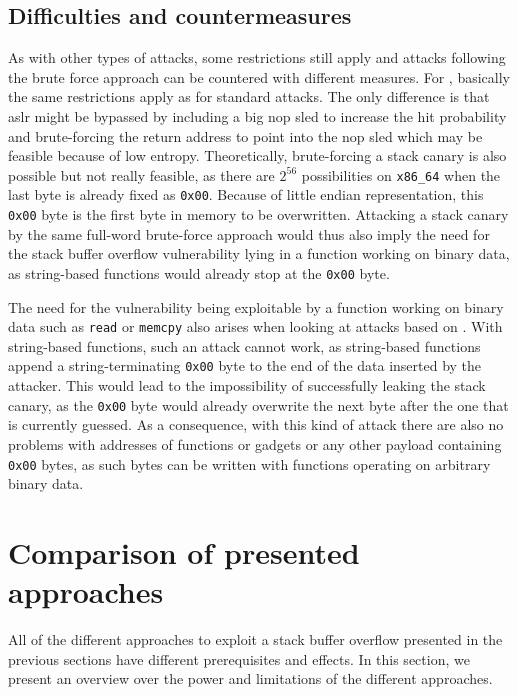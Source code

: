 \subsection{Difficulties and countermeasures}
\label{subsec:bf-countermeasures}

As with other types of attacks, some restrictions still apply and attacks following the brute force approach can be countered with different measures.
For , basically the same restrictions apply as for standard  attacks.
The only difference is that \gls{aslr} might be bypassed by including a big \acs{nop} sled to increase the hit probability and brute-forcing the return address to point into the \acs{nop} sled which may be feasible because of low entropy.
Theoretically, brute-forcing a stack canary is also possible but not really feasible, as there are $ 2^{56} $ possibilities on \texttt{x86\_64} when the last byte is already fixed as \texttt{0x00}.
Because of little endian representation, this \texttt{0x00} byte is the first byte in memory to be overwritten.
Attacking a stack canary by the same full-word brute-force approach would thus also imply the need for the stack buffer overflow vulnerability lying in a function working on binary data, as string-based functions would already stop at the \texttt{0x00} byte.

The need for the vulnerability being exploitable by a function working on binary data such as \texttt{read} or \texttt{memcpy} also arises when looking at attacks based on .
With string-based functions, such an attack cannot work, as string-based functions append a string-terminating \texttt{0x00} byte to the end of the data inserted by the attacker.
This would lead to the impossibility of successfully leaking the stack canary, as the \texttt{0x00} byte would already overwrite the next byte after the one that is currently guessed.
As a consequence, with this kind of attack there are also no problems with addresses of functions or gadgets or any other payload containing \texttt{0x00} bytes, as such bytes can be written with functions operating on arbitrary binary data.

\section{Comparison of presented approaches}
\label{sec:attack-comparison}

All of the different approaches to exploit a stack buffer overflow presented in the previous sections have different prerequisites and effects.
In this section, we present an overview over the power and limitations of the different approaches.

